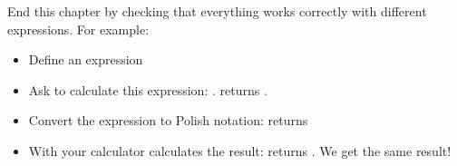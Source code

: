 \documentclass[11pt,class=report,crop=false]{standalone}
\begin{document}
\bigskip
\bigskip

End this chapter by checking that everything works correctly with different expressions.
For example:
\begin{itemize}
  \item Define an expression 
  \item Ask \Python{} to calculate this expression: . \Python{} returns .
  \item Convert the expression to Polish notation:  returns  
  
  \item With your calculator calculates the result:  returns . We get the same result!
  \end{itemize}
  
\end{document}
